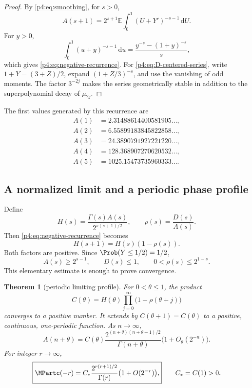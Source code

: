 \documentclass[11pt,oneside]{article}
\newtheorem{theorem}{Theorem}[section]
\theoremstyle{definition}
\theoremstyle{remark}
\newcommand{\E}{\mathbb E}
\newcommand{\dd}{\,\mathrm d}
\newcommand{\1}{\mathbf 1}
\begin{document}
\begin{proof}
By \cref{p4:eq:smoothing}, for \(s>0\),
\[
 A(s+1)=2^{s+1}\E\int_0^1(U+Y')^{-s-1}\dd U.
\]
For \(y>0\),
\[
 \int_0^1(u+y)^{-s-1}\dd u
 =\frac{y^{-s}-(1+y)^{-s}}s,
\]
which gives \cref{p4:eq:negative-recurrence}.  For \cref{p4:eq:D-centered-series}, write
\(1+Y=(3+Z)/2\), expand \((1+Z/3)^{-s}\), and use the vanishing of odd moments.
The factor \(3^{-2j}\) makes the series geometrically stable in addition to the
superpolynomial decay of \(\mu_{2j}\).
\end{proof}

The first values generated by this recurrence are
\begin{align}
 A(1)&=2.31488614400581905\ldots,\nonumber\\
 A(2)&=6.55899183845822858\ldots,\nonumber\\
 A(3)&=24.3890791927221220\ldots,\nonumber\\
 A(4)&=128.368907270620532\ldots,\nonumber\\
 A(5)&=1025.15473735960333\ldots.\label{p4:eq:negative-values}
\end{align}

\subsection{A normalized limit and a periodic phase profile}

Define
\begin{equation}\label{p4:eq:H-def}
 H(s)=\frac{\Gamma(s)A(s)}{2^{s(s+1)/2}},
 \qquad
 \rho(s)=\frac{D(s)}{A(s)}.
\end{equation}
Then \cref{p4:eq:negative-recurrence} becomes
\begin{equation}\label{p4:eq:H-recurrence}
 H(s+1)=H(s)(1-\rho(s)).
\end{equation}
Both factors are positive.  Since \(\Prob(Y\le1/2)=1/2\),
\begin{equation}\label{p4:eq:rho-bound}
 A(s)\ge2^{s-1},\qquad D(s)\le1,
 \qquad 0<\rho(s)\le2^{1-s}.
\end{equation}
This elementary estimate is enough to prove convergence.

\begin{theorem}[periodic limiting profile]\label{p4:thm:phase-limit}
For \(0<\theta\le1\), the product
\begin{equation}\label{p4:eq:Ctheta-product}
 C(\theta)=H(\theta)
 \prod_{j=0}^{\infty}\bigl(1-\rho(\theta+j)\bigr)
\end{equation}
converges to a positive number.  It extends by \(C(\theta+1)=C(\theta)\) to a
positive, continuous, one-periodic function.  As \(n\to\infty\),
\begin{equation}\label{p4:eq:A-phase-asymptotic}
 A(n+\theta)=C(\theta)
 \frac{2^{(n+\theta)(n+\theta+1)/2}}{\Gamma(n+\theta)}
 \bigl(1+O_\theta(2^{-n})\bigr).
\end{equation}
For integer \(r\to\infty\),
\begin{equation}\label{p4:eq:integer-negative-asymptotic}
 \boxed{\displaystyle
 \MPartc(-r)=C_*\frac{2^{r(r+1)/2}}{\Gamma(r)}
 \bigl(1+O(2^{-r})\bigr),}
 \qquad C_*=C(1)>0.
\end{equation}
\end{theorem}
\end{document}
